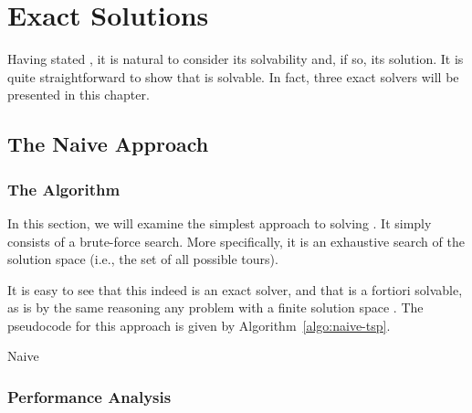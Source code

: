 \chapter{Exact Solutions}

Having stated \TSP, it is natural to consider its solvability and, if so, its solution. It is quite straightforward to show that \TSP{} is solvable. In fact, three exact solvers will be presented in this chapter.

\section{The Naive Approach}

\subsection{The Algorithm}

    In this section, we will examine the simplest approach to solving \TSP. It simply consists of a brute-force search. More specifically, it is an exhaustive search of the solution space (i.e., the set of all possible tours).

    It is easy to see that this indeed is an exact solver, and that \TSP{} is a fortiori solvable, as is by the same reasoning any problem with a finite solution space . The pseudocode for this approach is given by Algorithm~\ref{algo:naive-tsp}.

    \begin{algorithm}
        \caption{Naive \TSP}
        \label{algo:naive-tsp}

    \end{algorithm}

\subsection{Performance Analysis}

